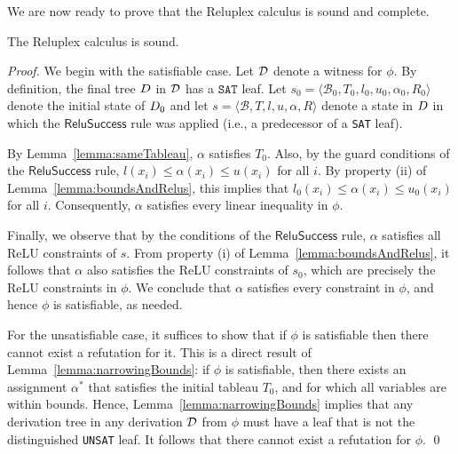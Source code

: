 \documentclass[a4paper]{llncs}
\newcommand{\basic}{\mathcal{B}}
\newcommand{\ub}{u}
\newcommand{\lb}{l}
\newcommand{\reluSet}{R}
\newcommand{\assignment}{\alpha{}}
\newcommand{\sat}{\texttt{SAT}}
\newcommand{\unsat}{\texttt{UNSAT}}
\newcommand{\rulename}[1]{\ensuremath{\mathsf{#1}}\xspace}
\newcommand{\reluSuccess}{\rulename{ReluSuccess}}
\begin{document}
\noindent
We are now ready to prove that the Reluplex calculus is sound and complete.
\begin{claim}
The Reluplex calculus is sound.
\end{claim}
\begin{proof}
  We begin with the satisfiable case. Let
  $\mathcal{D}{}$ denote a witness for
  $\phi$. By definition, the final tree $D{}$ in
  $\mathcal{D}{}$ has a $\sat{}$
  leaf. Let 
$s_0 = \langle \basic_0, T_0, \lb_0, \ub_0, \assignment_0, \reluSet_0 \rangle$ 
 denote the initial state of $D_0$ and let
  $s = \langle \basic, T, \lb, \ub, \assignment, \reluSet \rangle$ 
  denote a state in $D$ in which the \reluSuccess{}
  rule was applied (i.e., a predecessor of a \sat{} leaf). 

  By Lemma~\ref{lemma:sameTableau}, $\assignment$ satisfies
  $T_0$. Also,
  by the guard conditions of the $\reluSuccess{}$ rule, 
  $\lb(x_i)\leq \assignment(x_i)\leq \ub(x_i)$ for all $i$. 
  By property (ii) of Lemma~\ref{lemma:boundsAndRelus}, this implies that
  $\lb_0(x_i)\leq \assignment(x_i)\leq \ub_0(x_i)$ for all $i$.
  Consequently, $\assignment$ satisfies every linear inequality in $\phi$.

  Finally, we observe that by the conditions of
  the \reluSuccess{} rule, $\assignment$ satisfies all ReLU
  constraints of $s$. From property (i) of
  Lemma~\ref{lemma:boundsAndRelus}, it follows that $\assignment$ also
  satisfies the ReLU constraints of $s_0$, which are precisely the ReLU
  constraints in $\phi$.
  We conclude that $\assignment$ satisfies every constraint in $\phi$,
  and hence $\phi$ is satisfiable, as needed.

  For the unsatisfiable case, it suffices to show that if $\phi$ is
  satisfiable then there cannot exist a refutation for it.
  This is a direct result of
  Lemma~\ref{lemma:narrowingBounds}: if $\phi$ is satisfiable, then
  there exists an assignment $\assignment^*$ that satisfies the
  initial tableau $T_0$, and for which all variables are within
  bounds. Hence, Lemma~\ref{lemma:narrowingBounds} implies that
  any derivation tree in any derivation $\mathcal{D}$ from $\phi$ must have a leaf that is not the
  distinguished \unsat{} leaf. It follows that there cannot exist a
  refutation for $\phi$.
  \qed
\end{proof}
\end{document}
